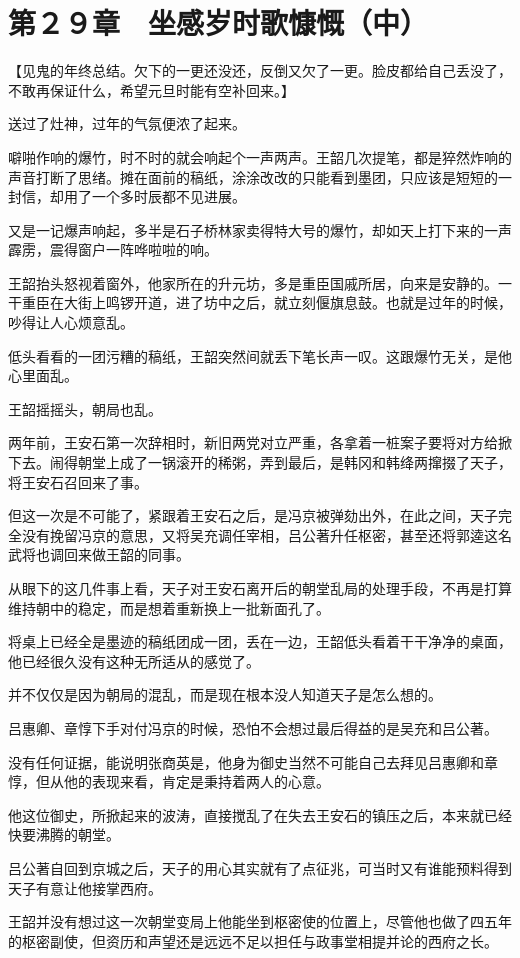 \section{第２９章　坐感岁时歌慷慨（中）}

【见鬼的年终总结。欠下的一更还没还，反倒又欠了一更。脸皮都给自己丢没了，不敢再保证什么，希望元旦时能有空补回来。】

送过了灶神，过年的气氛便浓了起来。

噼啪作响的爆竹，时不时的就会响起个一声两声。王韶几次提笔，都是猝然炸响的声音打断了思绪。摊在面前的稿纸，涂涂改改的只能看到墨团，只应该是短短的一封信，却用了一个多时辰都不见进展。

又是一记爆声响起，多半是石子桥林家卖得特大号的爆竹，却如天上打下来的一声霹雳，震得窗户一阵哗啦啦的响。

王韶抬头怒视着窗外，他家所在的升元坊，多是重臣国戚所居，向来是安静的。一干重臣在大街上鸣锣开道，进了坊中之后，就立刻偃旗息鼓。也就是过年的时候，吵得让人心烦意乱。

低头看看的一团污糟的稿纸，王韶突然间就丢下笔长声一叹。这跟爆竹无关，是他心里面乱。

王韶摇摇头，朝局也乱。

两年前，王安石第一次辞相时，新旧两党对立严重，各拿着一桩案子要将对方给掀下去。闹得朝堂上成了一锅滚开的稀粥，弄到最后，是韩冈和韩绛两撺掇了天子，将王安石召回来了事。

但这一次是不可能了，紧跟着王安石之后，是冯京被弹劾出外，在此之间，天子完全没有挽留冯京的意思，又将吴充调任宰相，吕公著升任枢密，甚至还将郭逵这名武将也调回来做王韶的同事。

从眼下的这几件事上看，天子对王安石离开后的朝堂乱局的处理手段，不再是打算维持朝中的稳定，而是想着重新换上一批新面孔了。

将桌上已经全是墨迹的稿纸团成一团，丢在一边，王韶低头看着干干净净的桌面，他已经很久没有这种无所适从的感觉了。

并不仅仅是因为朝局的混乱，而是现在根本没人知道天子是怎么想的。

吕惠卿、章惇下手对付冯京的时候，恐怕不会想过最后得益的是吴充和吕公著。

没有任何证据，能说明张商英是，他身为御史当然不可能自己去拜见吕惠卿和章惇，但从他的表现来看，肯定是秉持着两人的心意。

他这位御史，所掀起来的波涛，直接搅乱了在失去王安石的镇压之后，本来就已经快要沸腾的朝堂。

吕公著自回到京城之后，天子的用心其实就有了点征兆，可当时又有谁能预料得到天子有意让他接掌西府。

王韶并没有想过这一次朝堂变局上他能坐到枢密使的位置上，尽管他也做了四五年的枢密副使，但资历和声望还是远远不足以担任与政事堂相提并论的西府之长。


